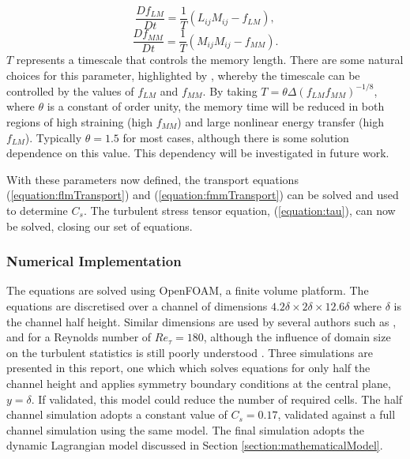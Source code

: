 \documentclass[12pt,oneside,a4paper]{article}
\begin{document}
\begin{equation}
\label{equation:flmTransport}
\frac{D f_{LM}}{Dt} = \frac{1}{T}(L_{ij}M_{ij} - f_{LM}),
\end{equation}
\begin{equation}
\label{equation:fmmTransport}
\frac{D f_{MM}}{Dt} = \frac{1}{T}(M_{ij}M_{ij} - f_{MM}).
\end{equation}
$T$ represents a timescale that controls the memory length. There are some natural choices for this parameter, highlighted by \cite{meneveau1996}, whereby the timescale can be controlled by the values of $f_{LM}$ and $f_{MM}$. By taking $T=\theta \Delta (f_{LM} f_{MM})^{-1/8}$, where $\theta$ is a constant of order unity, the memory time will be reduced in both regions of high straining (high $f_{MM}$) and large nonlinear energy transfer (high $f_{LM}$). Typically $\theta=1.5$ for most cases, although there is some solution dependence on this value. This dependency will be investigated in future work. 

With these parameters now defined, the transport equations (\ref{equation:flmTransport}) and (\ref{equation:fmmTransport}) can be solved and used to determine $C_s$. The turbulent stress tensor equation, (\ref{equation:tau}), can now be solved, closing our set of equations.

\subsubsection{Numerical Implementation}
The equations are solved using OpenFOAM, a finite volume platform. The equations are discretised over a channel of dimensions $4.2\delta \times 2\delta \times 12.6\delta$ where $\delta$ is the channel half height. Similar dimensions are used by several authors such as \cite{moser1999}, and \cite{vreman2014} for a Reynolds number of $Re_\tau = 180$, although the influence of domain size on the turbulent statistics is still poorly understood \citep{vreman2014}. Three simulations are presented in this report, one which which solves equations for only half the channel height and applies symmetry boundary conditions at the central plane, $y=\delta$. If validated, this model could reduce the number of required cells. The half channel simulation adopts a constant value of $C_s = 0.17$, validated against a full channel simulation using the same model. The final simulation adopts the dynamic Lagrangian model discussed in Section \ref{section:mathematicalModel}.
\end{document}
